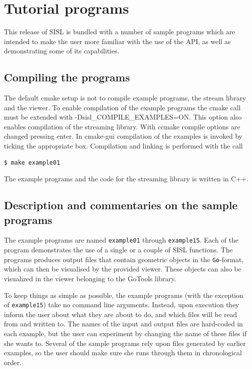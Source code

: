 \chapter{Tutorial programs}

This release of SISL is bundled with a number of sample programs which are intended
to make the user more familiar with the use of the API, as well as demonstrating 
some of its capabilities.  

\section{Compiling the programs}
The default cmake setup is not to compile example programs, the stream library and the viewer.
To enable compilation of the example programs the cmake call must be extended with
-Dsisl\_COMPILE\_EXAMPLES=ON. This option also enables compilation of the streaming library.
With ccmake compile options are changed pressing enter. In cmake-gui compilation of the examples
is invoked by ticking the appropriate box. Compilation and linking is performed with the call
\begin{verbatim}
$ make example01
\end{verbatim}
The example programs and the code for the streaming library is written in C++.


\section{Description and commentaries on the sample programs}

The example programs are named \verb/example01/ through \verb/example15/.  Each of the
program demonstrates the use of a single or a couple of SISL functions.  The programs
produces output files that contain geometric objects in the \verb/Go/-format, which 
can then be visualised by the provided viewer. These objects can also be visualized
in the viewer belonging to the GoTools library.

To keep things as simple as possible, the example programs (with the exception of
\verb/example15/) take no command line arguments.  Instead, upon execution they inform
the user about what they are about to do, and which files will be read from and written
to.  The names of the input and output files are hard-coded in each example, but the
user can experiment by changing the name of these files if she wants to.  Several of
the sample programs rely upon files generated by earlier examples, so the user should 
make sure she runs through them in chronological order.

